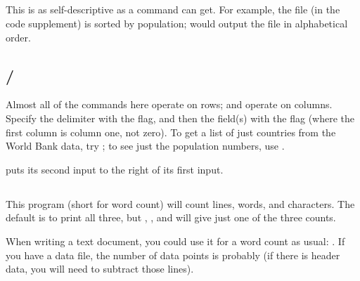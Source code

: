 \subsection{} This is as self-descriptive as a command can
get. For example, the  file (in the code supplement)
is sorted by population;  would output the file in
alphabetical order.


\subsection{/} Almost all of the commands here
operate on rows;  and  operate on columns. Specify the
delimiter with the  flag, and then the field(s) with the 
flag (where the first column is column one, not zero). To get a list of
just countries from the World Bank data, try ; to see just the population numbers, use .

 puts its second input to the right of its first input. 


\subsection{} 
This program (short for word count) will count lines, words, and
characters. The default is to print all three, but , ,
and  will give just one of the three counts.

When writing a text document, you could use it for a word count as
usual: . If you have a data file, the number of
data points is probably  (if there is header data, you
will need to subtract those lines).

